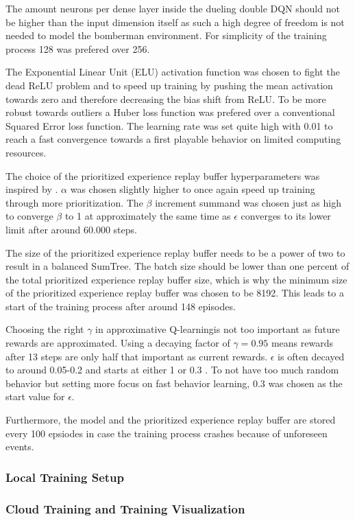 The amount neurons per dense layer inside the dueling double DQN should not be higher than the input dimension itself as such a high degree of freedom is not needed to model the bomberman environment. For simplicity of the training process 128 was prefered over 256. 

The Exponential Linear Unit (ELU) activation function was chosen to fight the dead ReLU problem and to speed up training by pushing the mean activation towards zero and therefore decreasing the bias shift from ReLU. To be more robust towards outliers a Huber loss function was prefered over a conventional Squared Error loss function. The learning rate was set quite high with 0.01 to reach a fast convergence towards a first playable behavior on limited computing resources. 

The choice of the prioritized experience replay buffer hyperparameters was inspired by \cite{Schaul2016}. $\alpha$ was chosen slightly higher to once again speed up training through more prioritization. The $\beta$ increment summand was chosen just as high to converge $\beta$ to 1 at approximately the same time as $\epsilon$ converges to its lower limit after around 60.000 steps. 

The size of the prioritized experience replay buffer needs to be a power of two to result in a balanced SumTree. The batch size should be lower than one percent of the total prioritized experience replay buffer size, which is why the minimum size of the prioritized experience replay buffer was chosen to be 8192. This leads to a start of the training process after around 148 episodes. 

Choosing the right $\gamma$ in approximative Q-learningis not too important as future rewards are approximated. Using a decaying factor of $\gamma=0.95$ means rewards after 13 steps are only half that important as current rewards. $\epsilon$ is often decayed to around 0.05-0.2 and starts at either 1 or 0.3 \cite{Hessel2017, Kormelink2018, Franca2019}. To not have too much random behavior but setting more focus on fast behavior learning, 0.3 was chosen as the start value for $\epsilon$. 

Furthermore, the model and the  prioritized experience replay buffer are stored every 100 epsiodes in case the training process crashes because of unforeseen events. 

\subsubsection{Local Training Setup}
\label{ch:approachBf}

\subsubsection{Cloud Training and Training Visualization}
\label{ch:approachBg}

